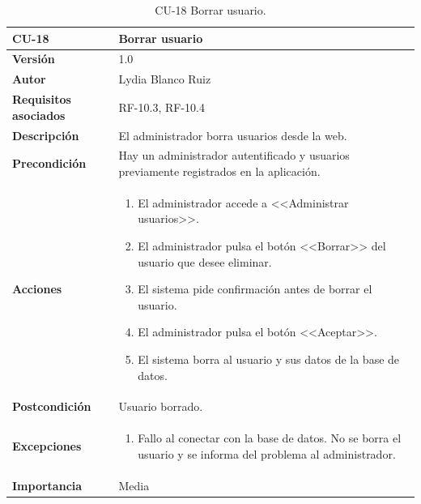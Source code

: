 \begin{table}[p]
	\centering
	\begin{tabularx}{\linewidth}{ p{} p{} }
		\toprule
		\textbf{CU-18}    & \textbf{ Borrar usuario}\\
		\toprule
		\textbf{Versión}              & 1.0    \\
		\textbf{Autor}                & Lydia Blanco Ruiz \\
		\textbf{Requisitos asociados} & RF-10.3, RF-10.4 \\
		\textbf{Descripción}          & El administrador borra usuarios desde la web. \\
		\textbf{Precondición}         & Hay un administrador autentificado y usuarios previamente registrados en la aplicación. \\
		\textbf{Acciones}             &
		\begin{enumerate}
			\def\labelenumi{\arabic{enumi}.}
			\tightlist
			\item El administrador accede a <<Administrar usuarios>>.
			\item El administrador pulsa el botón <<Borrar>> del usuario que desee eliminar.
			\item El sistema pide confirmación antes de borrar el usuario.
			\item El administrador pulsa el botón <<Aceptar>>.
			\item El sistema borra al usuario y sus datos de la base de datos.
		\end{enumerate}\\
		\textbf{Postcondición}        & Usuario borrado. \\
		\textbf{Excepciones}          & 
		\begin{enumerate}
			\def\labelenumi{\arabic{enumi}.}
			\tightlist
			\item Fallo al conectar con la base de datos. No se borra el usuario y se informa del problema al administrador.
		\end{enumerate}\\
		\textbf{Importancia}          & Media  \\
		\bottomrule
	\end{tabularx}
	\caption{CU-18 Borrar usuario.}
\end{table}

